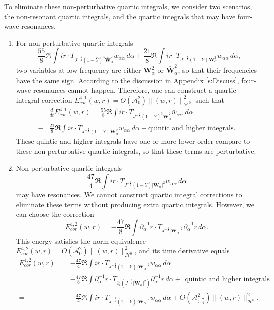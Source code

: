 \documentclass[10pt]{amsart}
\theoremstyle{remark}
\theoremstyle{definition}
\numberwithin{equation}{section}
\newcommand{\p}{\partial}
\renewcommand{\H}{{\mathcal H }}
\newcommand{\al}{\alpha}
\newcommand{\f}{\frac}
\newcommand{\bw}{\mathbf{W}}
\newcommand{\ASSharp}{{\mathcal{A}_{\sharp,\frac{7}{4}}^2}}
\begin{document}
To eliminate these non-perturbative quartic integrals, we consider two scenarios, the non-resonant quartic integrals, and the quartic integrals that may have four-wave resonances.
\begin{enumerate}
\item For non-perturbative quartic integrals 
\begin{equation*}
 - \f{55}{8}\Re \int ir \cdot T_{J^{-\f54}(1-\bar{Y})^3 \bar{\bw}_\al^2} \bar{w}_{\al \al} \,d\al   +\f{21}{8}\Re \int ir \cdot T_{J^{-\f94}(1-Y)\bw_\al^2} \bar{w}_{\al \al} \,d\al,
\end{equation*}
two variables at low frequency are either $\bw_\al^2$ or $\bar{\bw}_\al^2$, so that their frequencies have the same sign.
According to the discussion in Appendix \ref{s:Discuss}, four-wave resonances cannot happen.
Therefore, one can construct a quartic integral correction $E^{4,1}_{cor}(w,r) = O(\mathcal{A}_0^2)\|(w,r) \|^2_{\H^0}$ such that 
\begin{align*}
    &\frac{d}{dt} E^{4,1}_{cor}(w,r) = \f{55}{8}\Re \int ir \cdot T_{J^{-\f54}(1-\bar{Y})^3 \bar{\bw}_\al^2} \bar{w}_{\al \al} \,d\al   \\
    -&\f{21}{8}\Re \int ir \cdot T_{J^{-\f94}(1-Y)\bw_\al^2} \bar{w}_{\al \al} \,d\al+\text{quintic and higher integrals}.
\end{align*}
These quintic and higher integrals have one or more lower order compare to these non-perturbative quartic integrals, so that these terms are perturbative.

\item Non-perturbative quartic integrals 
 \begin{equation*}
        \f{47}{4}\Re \int i r \cdot T_{J^{-\f94}(1-\bar{Y})|\bw_\al|^2}\bar{w}_{\al \al}\,d\al
    \end{equation*}
may have resonances.
We cannot construct quartic integral corrections to eliminate these terms without producing extra quartic integrals.
However, we can choose the correction 
\begin{equation*}
    E^{4,2}_{cor}(w,r) = -\frac{47}{8}\Re \int \p_\al^{-1}r \cdot T_{J^{-\f34}|\bw_\al|^2}\p_\al^{-1} \bar{r} \,d\al. 
\end{equation*}
This energy satisfies the norm equivalence $E^{4,2}_{cor}(w,r) = O(\mathcal{A}_0^2)\|(w,r) \|^2_{\H^0}$, and its time derivative equals
\begin{align*}
    E^{4,2}_{cor}(w,r) =& -\f{47}{4}\Re \int i r \cdot T_{J^{-\f94}(1-\bar{Y})|\bw_\al|^2}\bar{w}_{\al \al}\,d\al  \\
    &-\frac{47}{8}\Re \int \p_\al^{-1}r \cdot T_{\partial_t(J^{-\f34}|\bw_\al|^2)}\p_\al^{-1} \bar{r} \,d\al + \text{ quintic and higher integrals} \\
    =& -\f{47}{4}\Re \int i r \cdot T_{J^{-\f94}(1-\bar{Y})|\bw_\al|^2}\bar{w}_{\al \al}\,d\al  +  O\left(\ASSharp \right) \|(w,r)\|_{\H^0}^2.
\end{align*}
\end{enumerate}
\end{document}
